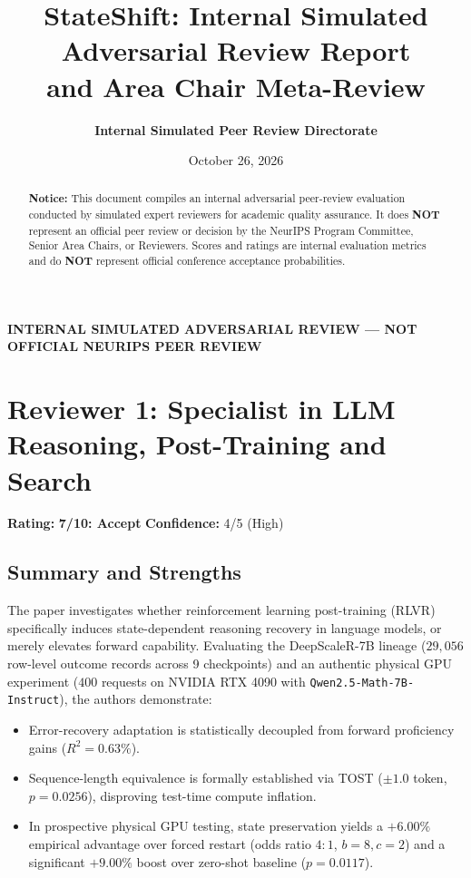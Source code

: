 \documentclass[11pt]{article}
\title{\textbf{StateShift: Internal Simulated Adversarial Review Report\\and Area Chair Meta-Review}}
\author{\textbf{Internal Simulated Peer Review Directorate}}
\date{October 26, 2026}
\begin{document}
\maketitle

\begin{center}
\color{red!80!black}\bfseries
INTERNAL SIMULATED ADVERSARIAL REVIEW --- NOT OFFICIAL NEURIPS PEER REVIEW
\end{center}
\vspace{0.5em}

\begin{abstract}
\noindent\textbf{Notice:} This document compiles an internal adversarial peer-review evaluation conducted by simulated expert reviewers for academic quality assurance. It does \textbf{NOT} represent an official peer review or decision by the NeurIPS Program Committee, Senior Area Chairs, or Reviewers. Scores and ratings are internal evaluation metrics and do \textbf{NOT} represent official conference acceptance probabilities.
\end{abstract}

\section*{Reviewer 1: Specialist in LLM Reasoning, Post-Training and Search}
\textbf{Rating:} \textbf{7/10: Accept} \quad \textbf{Confidence:} 4/5 (High)

\subsection*{Summary and Strengths}
The paper investigates whether reinforcement learning post-training (RLVR) specifically induces state-dependent reasoning recovery in language models, or merely elevates forward capability. Evaluating the DeepScaleR-7B lineage ($29,056$ row-level outcome records across 9 checkpoints) and an authentic physical GPU experiment ($400$ requests on NVIDIA RTX 4090 with \texttt{Qwen2.5-Math-7B-Instruct}), the authors demonstrate:
\begin{itemize}
    \item Error-recovery adaptation is statistically decoupled from forward proficiency gains ($R^2 = 0.63\%$).
    \item Sequence-length equivalence is formally established via TOST ($\pm 1.0$ token, $p = 0.0256$), disproving test-time compute inflation.
    \item In prospective physical GPU testing, state preservation yields a $+6.00\%$ empirical advantage over forced restart (odds ratio $4:1$, $b=8, c=2$) and a significant $+9.00\%$ boost over zero-shot baseline ($p = 0.0117$).
\end{itemize}
\end{document}
